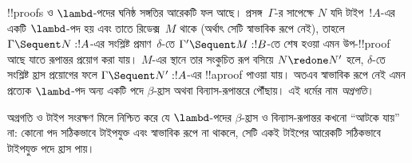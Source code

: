 \documentclass[../../../include/open-logic-section]{subfiles}
\begin{document}
!!{proof}s ও $\lambd$-পদের ঘনিষ্ঠ
সঙ্গতির আরেকটি ফল আছে। প্রসঙ্গ~$\Gamma$-র
সাপেক্ষে $N$ যদি টাইপ~$!A$-এর একটি
$\lambd$-পদ হয় এবং তাতে রিডেক্স~$M$
থাকে (অর্থাৎ সেটি স্বাভাবিক রূপে নেই),
তাহলে $\Gamma \Sequent N : !A$-এর
সংশ্লিষ্ট  প্রমাণ~$\delta$-তে
$\Gamma' \Sequent M: !B$-তে শেষ হওয়া
এমন উপ-!!{proof} আছে যাতে রূপান্তর
প্রয়োগ করা যায়। $M$-এর স্থানে তার
সংকুচিত রূপ বসিয়ে $N \redone N'$ হলে,
$\delta$-তে সংশ্লিষ্ট হ্রাস প্রয়োগের
ফলে $\Gamma \Sequent N' : !A$-এর
!!a{proof} পাওয়া যায়। অতএব স্বাভাবিক
রূপে নেই এমন প্রত্যেক $\lambd$-পদ অন্য
একটি পদে $\beta$-হ্রাস অথবা বিন্যাস-রূপান্তরে পৌঁছায়। এই ধর্মের
নাম \emph{অগ্রগতি}।

অগ্রগতি ও টাইপ সংরক্ষণ মিলে নিশ্চিত করে
যে $\lambd$-পদের $\beta$-হ্রাস ও বিন্যাস-রূপান্তর কখনো
“আটকে যায়” না: কোনো পদ সঠিকভাবে
টাইপযুক্ত এবং স্বাভাবিক রূপে না থাকলে,
সেটি একই টাইপের আরেকটি সঠিকভাবে
টাইপযুক্ত পদে হ্রাস পায়।
\end{document}
